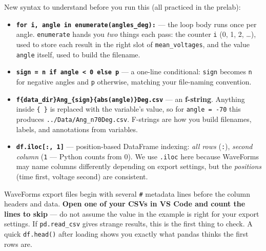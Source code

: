 \documentclass[
  12pt,
  letterpaper,
]{article}
\providecommand{\tightlist}{%
  \setlength{\itemsep}{0pt}\setlength{\parskip}{0pt}}
\begin{document}
New syntax to understand before you run this (all practiced in the
prelab):

\begin{itemize}
\tightlist
\item
  \textbf{\texttt{for\ i,\ angle\ in\ enumerate(angles\_deg):}} --- the
  loop body runs once per angle. \texttt{enumerate} hands you \emph{two}
  things each pass: the counter \texttt{i} (0, 1, 2, \ldots), used to
  store each result in the right slot of \texttt{mean\_voltages}, and
  the value \texttt{angle} itself, used to build the filename.
\item
  \textbf{\texttt{sign\ =\ \textquotesingle{}n\textquotesingle{}\ if\ angle\ \textless{}\ 0\ else\ \textquotesingle{}p\textquotesingle{}}}
  --- a one-line conditional: \texttt{sign} becomes
  \texttt{\textquotesingle{}n\textquotesingle{}} for negative angles and
  \texttt{\textquotesingle{}p\textquotesingle{}} otherwise, matching
  your file-naming convention.
\item
  \textbf{\texttt{f\textquotesingle{}\{data\_dir\}Ang\_\{sign\}\{abs(angle)\}Deg.csv\textquotesingle{}}}
  --- an \textbf{f-string}. Anything inside \texttt{\{\ \}} is replaced
  with the variable's value, so for \texttt{angle\ =\ -70} this produces
  \texttt{\textquotesingle{}../Data/Ang\_n70Deg.csv\textquotesingle{}}.
  F-strings are how you build filenames, labels, and annotations from
  variables.
\item
  \textbf{\texttt{df.iloc{[}:,\ 1{]}}} --- position-based DataFrame
  indexing: \emph{all rows} (\texttt{:}), \emph{second column}
  (\texttt{1} --- Python counts from 0). We use \texttt{.iloc} here
  because WaveForms may name columns differently depending on export
  settings, but the \emph{positions} (time first, voltage second) are
  consistent.
\end{itemize}

\begin{tcolorbox}[enhanced jigsaw, arc=.35mm, bottomrule=.15mm, bottomtitle=1mm, breakable, colback=white, colbacktitle=quarto-callout-warning-color!10!white, colframe=quarto-callout-warning-color-frame, coltitle=black, left=2mm, leftrule=.75mm, opacityback=0, opacitybacktitle=0.6, rightrule=.15mm, title=\textcolor{quarto-callout-warning-color}{\faExclamationTriangle}\hspace{0.5em}{Check \texttt{skiprows} against your actual file!}, titlerule=0mm, toprule=.15mm, toptitle=1mm]

WaveForms export files begin with several \texttt{\#} metadata lines
before the column headers and data. \textbf{Open one of your CSVs in VS
Code and count the lines to skip} --- do not assume the value in the
example is right for your export settings. If \texttt{pd.read\_csv}
gives strange results, this is the first thing to check. A quick
\texttt{df.head()} after loading shows you exactly what pandas thinks
the first rows are.

\end{tcolorbox}
\end{document}
